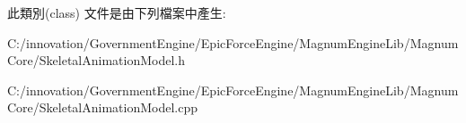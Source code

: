此類別(class) 文件是由下列檔案中產生\+:\begin{DoxyCompactItemize}
\item 
C\+:/innovation/\+Government\+Engine/\+Epic\+Force\+Engine/\+Magnum\+Engine\+Lib/\+Magnum\+Core/Skeletal\+Animation\+Model.\+h\item 
C\+:/innovation/\+Government\+Engine/\+Epic\+Force\+Engine/\+Magnum\+Engine\+Lib/\+Magnum\+Core/Skeletal\+Animation\+Model.\+cpp\end{DoxyCompactItemize}
